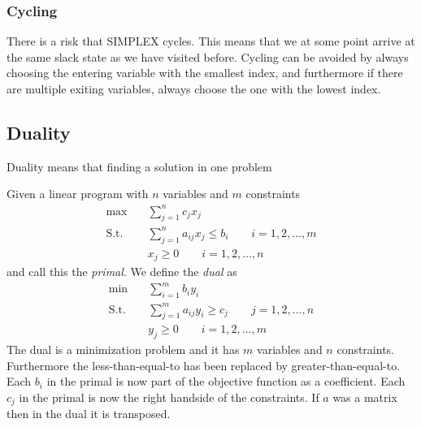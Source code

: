 \documentclass[10pt]{article}
\begin{document}
\subsubsection{Cycling} %
\label{ssub:cycling}
There is a risk that SIMPLEX cycles. This means that we at some point arrive at the same slack state as we have visited before. Cycling can be avoided by always choosing the entering variable with the smallest index, and furthermore if there are multiple exiting variables, always choose the one with the lowest index.


\subsection{Duality} %
\label{sub:duality}

Duality means that finding a solution in one problem 

Given a linear program with $n$ variables and $m$ constraints
\begin{align}
 \max &\quad \sum_{j=1}^n c_jx_j  \nonumber\\ 
 \text{S.t.} &\quad \sum_{j=1}^n a_{ij}x_j \leq b_i \qquad i=1,2,\ldots,m\label{dual10}\\
             &\quad x_j \geq 0 \qquad i=1,2,\ldots,n \nonumber
\end{align}
and call this the \emph{primal}. We define the \emph{dual} as 
\begin{align}
 \min &\quad \sum_{i=1}^m b_iy_i  \nonumber\\ 
 \text{S.t.} &\quad \sum_{j=1}^m a_{ij}y_i \geq c_j \qquad j=1,2,\ldots,n \label{dual0}\\
             &\quad y_j \geq 0 \qquad i=1,2,\ldots,m \nonumber
\end{align}
The dual is a minimization problem and it has $m$ variables and $n$ constraints. Furthermore the less-than-equal-to has been replaced by greater-than-equal-to. Each $b_i$ in the primal is now part of the objective function as a coefficient. Each $c_j$ in the primal is now the right handside of the constraints. If $a$ was a matrix then in the dual it is transposed. 
\end{document}
